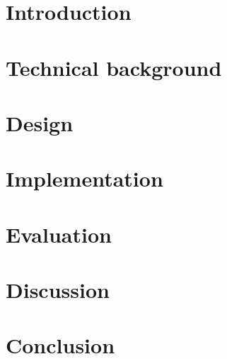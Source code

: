 \documentclass[11pt]{\class}
\title{\vspace{-1.25cm}\myfont Assignment \num - \subject \\ \name}
\author{Fredrik M\o rstad}
\begin{document}
\maketitle
\thispagestyle{fancy}

\section{Introduction}

\section{Technical background} 

\section{Design}
\section{Implementation}
\section{Evaluation}
\section{Discussion}
\section{Conclusion}

 

\end{document}

